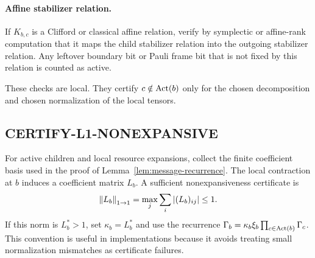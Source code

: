 \paragraph{Affine stabilizer relation.}
If \(K_{b,c}\) is a Clifford or classical affine relation, verify by symplectic or affine-rank computation that it maps the child stabilizer relation into the outgoing stabilizer relation. Any leftover boundary bit or Pauli frame bit that is not fixed by this relation is counted as active.

These checks are local. They certify \(c\notin\operatorname{Act}(b)\) only for the chosen decomposition and chosen normalization of the local tensors.

\begin{center}
\end{center}

\subsection{CERTIFY-L1-NONEXPANSIVE}

For active children and local resource expansions, collect the finite coefficient basis used in the proof of Lemma~\ref{lem:message-recurrence}. The local contraction at \(b\) induces a coefficient matrix \(L_b\). A sufficient nonexpansiveness certificate is
\[
\left\lVert L_b \right\rVert_{1\to1}=\max_j\sum_i |(L_b)_{ij}|\le 1.
\]
If this norm is \(L_b^\ast>1\), set \(\kappa_b=L_b^\ast\) and use the recurrence \(\Gamma_b=\kappa_b\xi_b\prod_{c\in\operatorname{Act}(b)}\Gamma_c\). This convention is useful in implementations because it avoids treating small normalization mismatches as certificate failures.

